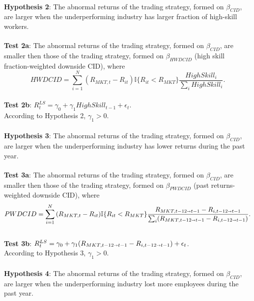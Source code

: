 \documentclass[12pt]{article}
\begin{document}
\paragraph{}
\textbf{Hypothesis 2}: The abnormal returns of the trading strategy, formed on $\beta_{CID}$, are larger when the underperforming industry has larger fraction of high-skill workers.
\paragraph{}
\textbf{Test 2a}: The abnormal returns of the trading strategy, formed on $\beta_{CID}$, are smaller then those of the trading strategy, formed on $\beta_{HWDCID}$ (high skill fraction-weighted downside CID), where $$HWDCID = \sum^{N}_{i=1}{(R_{MKT,t}-R_{it}) \mathbb{I}\{R_{it}<R_{MKT}\} \frac{HighSkill_i}{\sum_{i} HighSkill_i}}.$$
\\ \-\hspace{0.3cm}
\textbf{Test 2b}: $R^{LS}_{t} = \gamma_0 +\gamma_1 HighSkill_{t-1}+\epsilon_t$. \\ 
According to Hypothesis 2, $\gamma_1>0$.
\paragraph{}
\textbf{Hypothesis 3}: The abnormal returns of the trading strategy, formed on $\beta_{CID}$, are larger when the underperforming industry has lower returns during the past year.
\paragraph{}
\textbf{Test 3a}: The abnormal returns of the trading strategy, formed on $\beta_{CID}$, are smaller then those of the trading strategy, formed on $\beta_{PWDCID}$ (past returns-weighted downside CID), where $$PWDCID = \sum^{N}_{i=1}{(R_{MKT,t}-R_{it}) \mathbb{I}\{R_{it}<R_{MKT}\} \frac{R_{MKT, t-12 \shortrightarrow t-1} - R_{i, t-12 \shortrightarrow t-1}}{\sum_{i} (R_{MKT, t-12 \shortrightarrow t-1} - R_{i, t-12 \shortrightarrow t-1}) }}.$$
\\ \-\hspace{0.3cm}
\textbf{Test 3b}: $R^{LS}_{t} = \gamma_0 +\gamma_1 (R_{MKT, t-12 \shortrightarrow t-1} - R_{i, t-12 \shortrightarrow t-1})+\epsilon_t$. \\ 
According to Hypothesis 3, $\gamma_1>0$.
\paragraph{}
\textbf{Hypothesis 4}: The abnormal returns of the trading strategy, formed on $\beta_{CID}$, are larger when the underperforming industry lost more employees during the past year.
\end{document}
